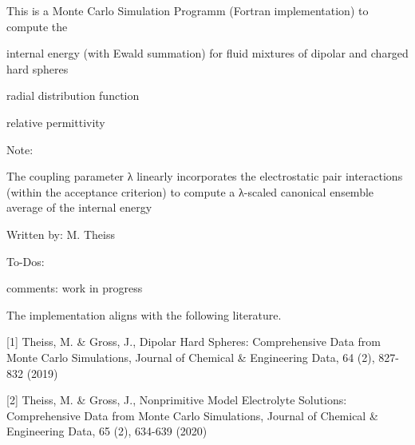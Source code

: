 This is a Monte Carlo Simulation Programm (Fortran implementation) to compute the
\begin{DoxyItemize}
\item internal energy (with Ewald summation) for fluid mixtures of dipolar and charged hard spheres
\item radial distribution function
\item relative permittivity
\item 
\end{DoxyItemize}

Note\+:
\begin{DoxyItemize}
\item The coupling parameter λ linearly incorporates the electrostatic pair interactions (within the acceptance criterion) to compute a λ-\/scaled canonical ensemble average of the internal energy
\end{DoxyItemize}

Written by\+: M. Theiss

To-\/\+Do\textquotesingle{}s\+:
\begin{DoxyItemize}
\item comments\+: work in progress
\end{DoxyItemize}

The implementation aligns with the following literature.

\mbox{[}1\mbox{]} Theiss, M. \& Gross, J., Dipolar Hard Spheres\+: Comprehensive Data from Monte Carlo Simulations, Journal of Chemical \& Engineering Data, 64 (2), 827-\/832 (2019)

\mbox{[}2\mbox{]} Theiss, M. \& Gross, J., Nonprimitive Model Electrolyte Solutions\+: Comprehensive Data from Monte Carlo Simulations, Journal of Chemical \& Engineering Data, 65 (2), 634-\/639 (2020) 